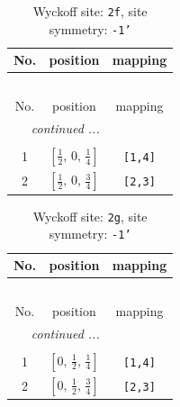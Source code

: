 \documentclass[fleqn,8pt]{jsarticle}
\begin{document}
\renewcommand{\arraystretch}{1.2}
\begin{longtable}{ccc}
\caption{Wyckoff site: {\tt 2f}, site symmetry: {\tt -1'}}
 \\
 \hline \hline
No. & position & mapping \\ \hline \endfirsthead

\multicolumn{2}{l}{\tablename\ \thetable{}} \\
 \hline \hline
No. & position & mapping \\ \hline \endhead

 \hline \hline
\multicolumn{2}{r}{\footnotesize\it continued ...} \\ \endfoot

 \hline \hline
\multicolumn{2}{r}{} \\ \endlastfoot

1 & $\left[ \frac{1}{2},\, 0,\, \frac{1}{4} \right]$ & {\tt [1,4]} \\ \hline
2 & $\left[ \frac{1}{2},\, 0,\, \frac{3}{4} \right]$ & {\tt [2,3]} \\
\end{longtable}
\renewcommand{\arraystretch}{1.2}
\begin{longtable}{ccc}
\caption{Wyckoff site: {\tt 2g}, site symmetry: {\tt -1'}}
 \\
 \hline \hline
No. & position & mapping \\ \hline \endfirsthead

\multicolumn{2}{l}{\tablename\ \thetable{}} \\
 \hline \hline
No. & position & mapping \\ \hline \endhead

 \hline \hline
\multicolumn{2}{r}{\footnotesize\it continued ...} \\ \endfoot

 \hline \hline
\multicolumn{2}{r}{} \\ \endlastfoot

1 & $\left[ 0,\, \frac{1}{2},\, \frac{1}{4} \right]$ & {\tt [1,4]} \\ \hline
2 & $\left[ 0,\, \frac{1}{2},\, \frac{3}{4} \right]$ & {\tt [2,3]} \\
\end{longtable}
\renewcommand{\arraystretch}{1.2}
\end{document}

